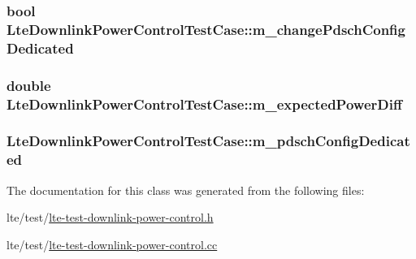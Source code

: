 \subsubsection[{\texorpdfstring{m\+\_\+change\+Pdsch\+Config\+Dedicated}{m_changePdschConfigDedicated}}]{\setlength{\rightskip}{0pt plus 5cm}bool Lte\+Downlink\+Power\+Control\+Test\+Case\+::m\+\_\+change\+Pdsch\+Config\+Dedicated\hspace{0.3cm}{\ttfamily [private]}}\hypertarget{classLteDownlinkPowerControlTestCase_ad637612640933b4257b61f515ae44186}{}\label{classLteDownlinkPowerControlTestCase_ad637612640933b4257b61f515ae44186}
\subsubsection[{\texorpdfstring{m\+\_\+expected\+Power\+Diff}{m_expectedPowerDiff}}]{\setlength{\rightskip}{0pt plus 5cm}double Lte\+Downlink\+Power\+Control\+Test\+Case\+::m\+\_\+expected\+Power\+Diff\hspace{0.3cm}{\ttfamily [private]}}\hypertarget{classLteDownlinkPowerControlTestCase_a02131214e45a4ecd49f1a8d3b9b65675}{}\label{classLteDownlinkPowerControlTestCase_a02131214e45a4ecd49f1a8d3b9b65675}
\subsubsection[{\texorpdfstring{m\+\_\+pdsch\+Config\+Dedicated}{m_pdschConfigDedicated}}]{ Lte\+Downlink\+Power\+Control\+Test\+Case\+::m\+\_\+pdsch\+Config\+Dedicated\hspace{0.3cm}{\ttfamily [private]}}\hypertarget{classLteDownlinkPowerControlTestCase_a585b94172221a43077e191eb81bf72e2}{}\label{classLteDownlinkPowerControlTestCase_a585b94172221a43077e191eb81bf72e2}


The documentation for this class was generated from the following files\+:\begin{DoxyCompactItemize}
\item 
lte/test/\hyperlink{lte-test-downlink-power-control_8h}{lte-\/test-\/downlink-\/power-\/control.\+h}\item 
lte/test/\hyperlink{lte-test-downlink-power-control_8cc}{lte-\/test-\/downlink-\/power-\/control.\+cc}\end{DoxyCompactItemize}
